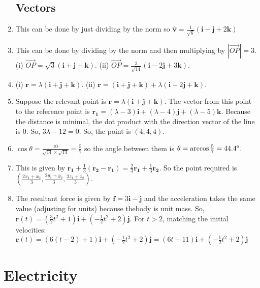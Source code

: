 \documentclass{article}
\begin{document}
\begin{enumerate}
\subsection{Vectors}
    \item This can be done by just dividing by the norm so $\hat{\boldsymbol{v}}=\frac{1}{\sqrt{6}} (\boldsymbol{i}-\boldsymbol{j}+2\boldsymbol{k})$
    \item This can be done by dividing by the norm and then multiplying by $|\vec{OP}|=3$. (i) $\vec{OP}=\sqrt{3}(\boldsymbol{i}+\boldsymbol{j}+\boldsymbol{k})$. (ii) $\vec{OP}=\frac{3}{\sqrt{14}} (\boldsymbol{i}-2\boldsymbol{j}+3\boldsymbol{k})$.
    \item (i) $\boldsymbol{r}=\lambda (\boldsymbol{i}+\boldsymbol{j}+\boldsymbol{k})$. (ii) $\boldsymbol{r}=(\boldsymbol{i}+\boldsymbol{j}+\boldsymbol{k})+\lambda (\boldsymbol{i}-2\boldsymbol{j}+\boldsymbol{k})$.
    \item Suppose the relevant point is $\boldsymbol{r}=\lambda (\boldsymbol{i}+\boldsymbol{j}+\boldsymbol{k})$. The vector from this point to the reference point is $\boldsymbol{r_1}=(\lambda - 3)\boldsymbol{i} + (\lambda-4) \boldsymbol{j}+(\lambda-5)\boldsymbol{k}$. Because the distance is minimal, the dot product with the direction vector of the line is 0. So, $3\lambda-12=0$. So, the point is $(4,4,4)$.
    \item $\cos{\theta}= \frac{10}{\sqrt{14}\times \sqrt{14}}=\frac{5}{7}$ so the angle between them is $\theta = \arccos{\frac{5}{7}}=44.4 \degree$.
    \item This is given by $\boldsymbol{r_1}+\frac{1}{3}(\boldsymbol{r_2}-\boldsymbol{r_1})=\frac{2}{3} \boldsymbol{r_1}+\frac{1}{3} \boldsymbol{r_2}$. So the point required is $(\frac{2x_1+x_2}{3},\frac{2y_1+y_2}{3},\frac{2z_1+z_2}{3})$.
    \item The resultant force is given by $\boldsymbol{f}=3\boldsymbol{i}-\boldsymbol{j}$ and the acceleration takes the same value (adjusting for units) because thebody is unit mass. So, $\boldsymbol{r}(t)=(\frac{3}{2}t^2 + 1)\boldsymbol{i} + (-\frac{1}{2}t^2 +2)\boldsymbol{j}$. For $t>2$, matching the initial velocities: $\boldsymbol{r}(t)=(6(t-2)+1)\boldsymbol{i}+(-\frac{1}{2}t^2 +2)\boldsymbol{j}=(6t-11)\boldsymbol{i}+(-\frac{1}{2}t^2 +2)\boldsymbol{j}$
\end{enumerate}
\newpage
\section{Electricity}
\end{document}
